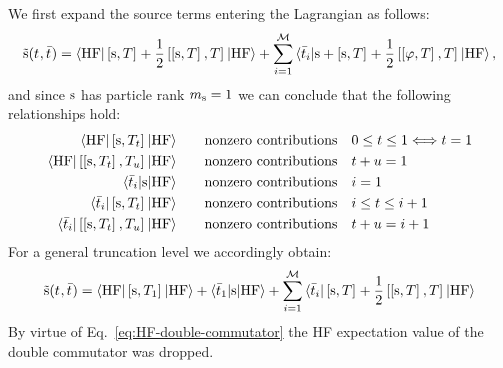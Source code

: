 We first expand the source terms entering the Lagrangian as follows:
\begin{equation}
  \tilde{\mathrm{s}}(t_{}, \bar{t}_{}) =
  \braket{\mathrm{HF} | \left[ \mathrm{s}, T \right]^{} + \frac{1}{2}\left[ \left[ \mathrm{s}, T \right]^{}, T \right]^{} | \mathrm{HF}}
  + \sum_{i=1}^{\mathcal{M}}\braket{\bar{t}_{i} | \mathrm{s} + \left[ \mathrm{s}, T \right]^{} +
  \frac{1}{2}\left[ \left[ \varphi, T \right]^{}, T \right]^{} | \mathrm{HF}},
\end{equation}
and since $\mathrm{s}$ has particle rank $m_{\mathrm{s}} = 1$ we can conclude that the
following relationships hold:
\begin{subequations}
\begin{align}
  \braket{\mathrm{HF} |
  \left[ \mathrm{s}, T_t \right]^{}
  | \mathrm{HF}}
  &\quad\quad\text{nonzero contributions} \quad 0 \leq t \leq 1
  \Longleftrightarrow t = 1 \\
  \braket{\mathrm{HF} |
  \left[ \left[ \mathrm{s}, T_t \right]^{}, T_u \right]^{}
  | \mathrm{HF}}
  &\quad\quad\text{nonzero contributions} \quad t + u = 1
  \label{eq:HF-double-commutator} \\
  \braket{\bar{t}_{i} |
  \mathrm{s}
  | \mathrm{HF} }
  &\quad\quad\text{nonzero contributions} \quad i = 1 \\
  \braket{\bar{t}_{i} |
  \left[ \mathrm{s}, T_t \right]^{}
  | \mathrm{HF} }
  &\quad\quad\text{nonzero contributions} \quad i \leq t \leq i + 1 \\
  \braket{\bar{t}_{i} |
  \left[ \left[ \mathrm{s}, T_t \right]^{}, T_u \right]^{}
  | \mathrm{HF} }
  &\quad\quad\text{nonzero contributions} \quad t + u = i + 1
\end{align}
\end{subequations}
For a general truncation level we accordingly obtain:
\begin{equation}\label{eq:source-term}
  \tilde{\mathrm{s}}(t_{}, \bar{t}_{}) =
  \braket{\mathrm{HF} | \left[ \mathrm{s}, T_1 \right]^{} | \mathrm{HF}}
  + \braket{\bar{t}_{1} | \mathrm{s} | \mathrm{HF}}
  + \sum_{i=1}^{\mathcal{M}}\braket{\bar{t}_{i} | \left[ \mathrm{s}, T \right]^{} + \frac{1}{2}\left[ \left[ \mathrm{s}, T \right]^{}, T \right]^{} | \mathrm{HF}}
\end{equation}
By virtue of Eq.~\eqref{eq:HF-double-commutator} the \acs{HF}
expectation value of the double commutator was dropped.

